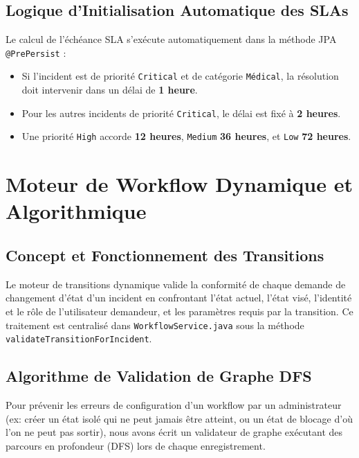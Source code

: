 \documentclass[12pt,a4paper]{article}
\begin{document}
\subsection{Logique d'Initialisation Automatique des SLAs}
Le calcul de l'échéance SLA s'exécute automatiquement dans la méthode JPA \texttt{@PrePersist} :
\begin{itemize}
    \item Si l'incident est de priorité \texttt{Critical} et de catégorie \texttt{Médical}, la résolution doit intervenir dans un délai de \textbf{1 heure}.
    \item Pour les autres incidents de priorité \texttt{Critical}, le délai est fixé à \textbf{2 heures}.
    \item Une priorité \texttt{High} accorde \textbf{12 heures}, \texttt{Medium} \textbf{36 heures}, et \texttt{Low} \textbf{72 heures}.
\end{itemize}

\clearpage

\section{Moteur de Workflow Dynamique et Algorithmique}

\subsection{Concept et Fonctionnement des Transitions}
Le moteur de transitions dynamique valide la conformité de chaque demande de changement d'état d'un incident en confrontant l'état actuel, l'état visé, l'identité et le rôle de l'utilisateur demandeur, et les paramètres requis par la transition. Ce traitement est centralisé dans \texttt{WorkflowService.java} sous la méthode \texttt{validateTransitionForIncident}. 

\subsection{Algorithme de Validation de Graphe DFS}
Pour prévenir les erreurs de configuration d'un workflow par un administrateur (ex: créer un état isolé qui ne peut jamais être atteint, ou un état de blocage d'où l'on ne peut pas sortir), nous avons écrit un validateur de graphe exécutant des parcours en profondeur (DFS) lors de chaque enregistrement.
\end{document}
